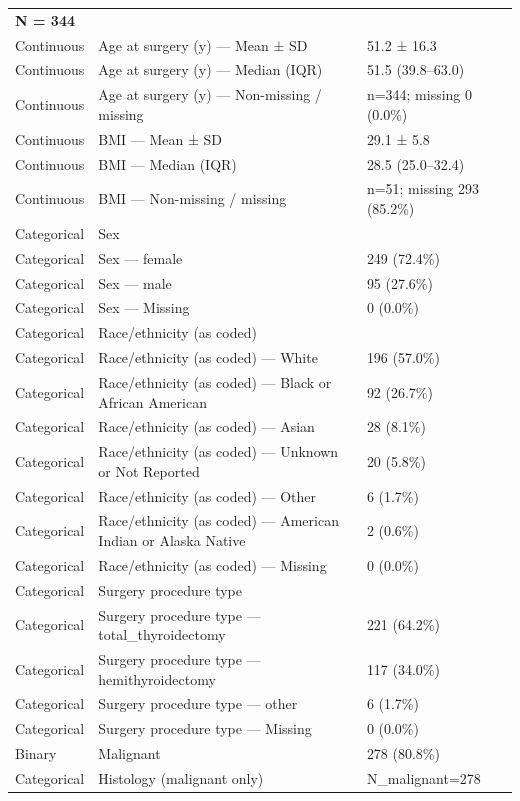 \begin{table}[htbp]
\begin{tabular}{lll}
\multicolumn{3}{l}{\textbf{N = 344}} \\
Continuous & Age at surgery (y) — Mean ± SD & 51.2 ± 16.3 \\
Continuous & Age at surgery (y) — Median (IQR) & 51.5 (39.8–63.0) \\
Continuous & Age at surgery (y) — Non-missing / missing & n=344; missing 0 (0.0\%) \\
Continuous & BMI — Mean ± SD & 29.1 ± 5.8 \\
Continuous & BMI — Median (IQR) & 28.5 (25.0–32.4) \\
Continuous & BMI — Non-missing / missing & n=51; missing 293 (85.2\%) \\
Categorical & Sex &  \\
Categorical & Sex — female & 249 (72.4\%) \\
Categorical & Sex — male & 95 (27.6\%) \\
Categorical & Sex — Missing & 0 (0.0\%) \\
Categorical & Race/ethnicity (as coded) &  \\
Categorical & Race/ethnicity (as coded) — White & 196 (57.0\%) \\
Categorical & Race/ethnicity (as coded) — Black or African American & 92 (26.7\%) \\
Categorical & Race/ethnicity (as coded) — Asian & 28 (8.1\%) \\
Categorical & Race/ethnicity (as coded) — Unknown or Not Reported & 20 (5.8\%) \\
Categorical & Race/ethnicity (as coded) — Other & 6 (1.7\%) \\
Categorical & Race/ethnicity (as coded) — American Indian or Alaska Native & 2 (0.6\%) \\
Categorical & Race/ethnicity (as coded) — Missing & 0 (0.0\%) \\
Categorical & Surgery procedure type &  \\
Categorical & Surgery procedure type — total\_thyroidectomy & 221 (64.2\%) \\
Categorical & Surgery procedure type — hemithyroidectomy & 117 (34.0\%) \\
Categorical & Surgery procedure type — other & 6 (1.7\%) \\
Categorical & Surgery procedure type — Missing & 0 (0.0\%) \\
Binary & Malignant & 278 (80.8\%) \\
Categorical & Histology (malignant only) & N\_malignant=278 \\

\end{tabular}
\end{table}
